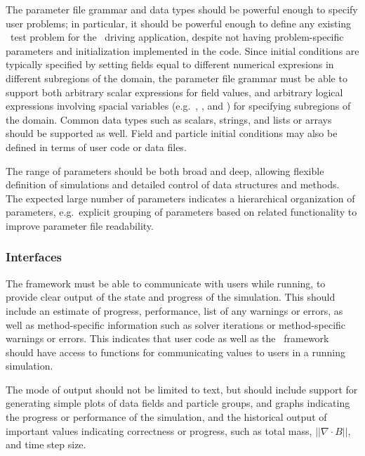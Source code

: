 \documentclass[10pt,twocolumn]{article}
\begin{document}
The parameter file grammar and data types should be powerful enough to
specify user problems; in particular, it should be powerful enough to
define any existing \enzo\ test problem for the \enzoii\ driving
application, despite not having problem-specific parameters and
initialization implemented in the code.  Since initial conditions are
typically specified by setting fields equal to different numerical
expresions in different subregions of the domain, the parameter file
grammar must be able to support both arbitrary scalar expressions for
field values, and arbitrary logical expressions involving spacial
variables (e.g.~, , and ) for specifying
subregions of the domain.  Common data types such as scalars, strings,
and lists or arrays should be supported as well.  Field and particle
initial conditions may also be defined in terms of user code or data
files.

The range of parameters should be both broad and deep, allowing
flexible definition of simulations and detailed control of data
structures and methods.  The expected large number of parameters
indicates a hierarchical organization of parameters, e.g.~explicit
grouping of parameters based on related functionality to improve
parameter file readability.

\subsubsection{Interfaces} \label{sss:require-interfaces}

The framework must be able to communicate with users while running, to
provide clear output of the state and progress of the simulation.
This should include an estimate of progress, performance, list of any
warnings or errors, as well as method-specific information such as
solver iterations or method-specific warnings or errors.  This
indicates that user code as well as the \cello\ framework should have
access to functions for communicating values to users in a running
simulation.

The mode of output should not be limited to text, but should include
support for generating simple plots of data fields and particle
groups, and graphs indicating the progress or performance of the
simulation, and the historical output of important values indicating
correctness or progress, such as total mass, $||\nabla \cdot B||$, and
time step size.
\end{document}

